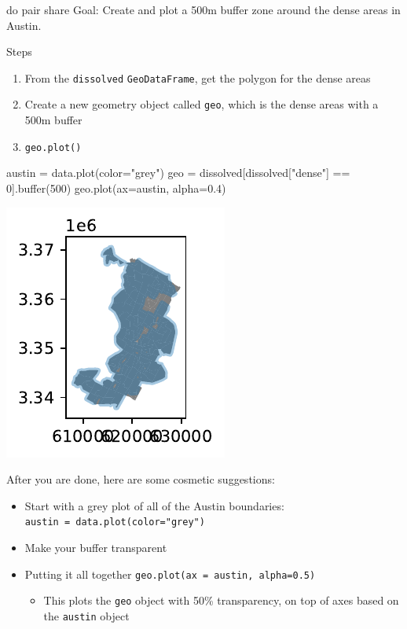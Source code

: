 \documentclass[
  ignorenonframetext,
]{beamer}
\newenvironment{Shaded}{\begin{snugshade}}{\end{snugshade}}
\newcommand{\BuiltInTok}[1]{\textcolor[rgb]{0.00,0.23,0.31}{#1}}
\newcommand{\DecValTok}[1]{\textcolor[rgb]{0.68,0.00,0.00}{#1}}
\newcommand{\FloatTok}[1]{\textcolor[rgb]{0.68,0.00,0.00}{#1}}
\newcommand{\NormalTok}[1]{\textcolor[rgb]{0.00,0.23,0.31}{#1}}
\newcommand{\OperatorTok}[1]{\textcolor[rgb]{0.37,0.37,0.37}{#1}}
\newcommand{\StringTok}[1]{\textcolor[rgb]{0.13,0.47,0.30}{#1}}
\providecommand{\tightlist}{%
  \setlength{\itemsep}{0pt}\setlength{\parskip}{0pt}}\usepackage{longtable,booktabs,array}
\begin{document}
\begin{frame}[fragile]{do pair share}
\label{do-pair-share}
Goal: Create and plot a 500m buffer zone around the dense areas in
Austin.

Steps

\begin{enumerate}
\tightlist
\item
  From the \texttt{dissolved} \texttt{GeoDataFrame}, get the polygon for
  the dense areas
\item
  Create a new geometry object called \texttt{geo}, which is the dense
  areas with a 500m buffer
\item
  \texttt{geo.plot()}
\end{enumerate}

\begin{Shaded}
\begin{Highlighting}[]
\NormalTok{austin }\OperatorTok{=}\NormalTok{ data.plot(color}\OperatorTok{=}\StringTok{"grey"}\NormalTok{)}
\NormalTok{geo }\OperatorTok{=}\NormalTok{ dissolved[dissolved[}\StringTok{"dense"}\NormalTok{] }\OperatorTok{==} \DecValTok{0}\NormalTok{].}\BuiltInTok{buffer}\NormalTok{(}\DecValTok{500}\NormalTok{)}
\NormalTok{geo.plot(ax}\OperatorTok{=}\NormalTok{austin, alpha}\OperatorTok{=}\FloatTok{0.4}\NormalTok{)}
\end{Highlighting}
\end{Shaded}

\includegraphics{spatial_2_files/figure-beamer/cell-30-output-1.pdf}

After you are done, here are some cosmetic suggestions:

\begin{itemize}
\tightlist
\item
  Start with a grey plot of all of the Austin boundaries:
  \texttt{austin\ =\ data.plot(color="grey")}
\item
  Make your buffer transparent
\item
  Putting it all together \texttt{geo.plot(ax\ =\ austin,\ alpha=0.5)}

  \begin{itemize}
  \tightlist
  \item
    This plots the \texttt{geo} object with 50\% transparency, on top of
    axes based on the \texttt{austin} object
  \end{itemize}
\end{itemize}
\end{frame}
\end{document}
